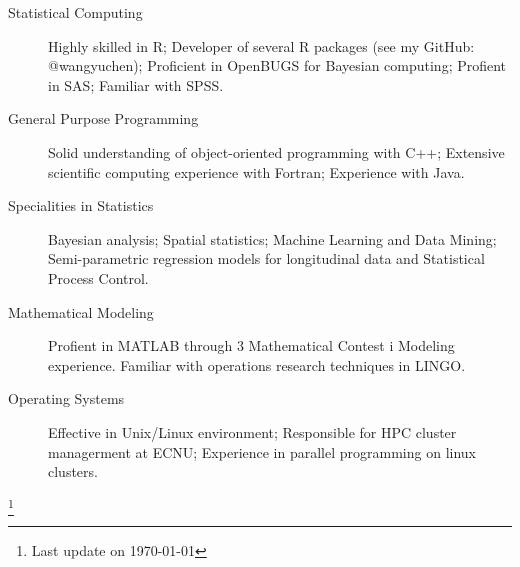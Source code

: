 \documentclass[10pt]{article}
\begin{document}
\begin{description}
	\item[Statistical Computing] Highly skilled in R; Developer of several R packages (see my GitHub: @wangyuchen); Proficient in OpenBUGS for Bayesian computing; Profient in SAS; Familiar with SPSS.
	\item[General Purpose Programming] Solid understanding of object-oriented programming with C++; Extensive scientific computing experience with Fortran; Experience with Java.
	\item[Specialities in Statistics] Bayesian analysis; Spatial statistics; Machine Learning and Data Mining; Semi-parametric regression models for longitudinal data and Statistical Process Control.
	\item[Mathematical Modeling] Profient in MATLAB through 3 Mathematical Contest i Modeling experience. Familiar with operations research techniques in LINGO.
	\item[Operating Systems] Effective in Unix/Linux environment; Responsible for HPC cluster managerment at ECNU; Experience in parallel programming on linux clusters.
\end{description}

\let\thefootnote\relax\footnote{Last update on \today}
\end{document}
